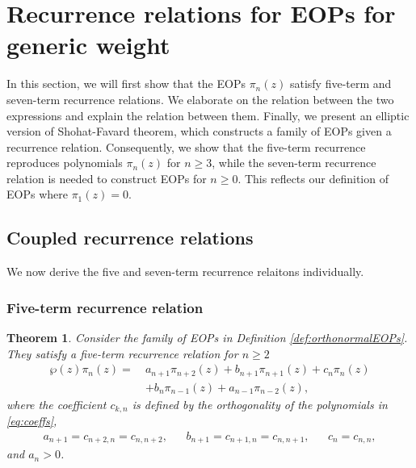 \documentclass[11pt,a4paper]{article}
\newtheorem{theorem}{Theorem}
\theoremstyle{definition}
\numberwithin{equation}{section}
\numberwithin{theorem}{section}
\newcommand{\myrmk}[2]{\begin{quote}\fbox{\begin{minipage}{\linewidth}\small \noindent{\color{red}\bf #2:} #1{\color{red}}\end{minipage}}\end{quote}}
\newcommand{\rmkH}[1]{\myrmk{#1}{HD}}
\begin{document}
\section{Recurrence relations for EOPs for generic weight}\label{sec:rec-rel}
In this section, we will first show that the EOPs $\pi_n(z)$ satisfy five-term and seven-term recurrence relations. We elaborate on the relation between the two expressions and explain the relation between them. Finally, we present an elliptic version of Shohat-Favard theorem, which constructs a family of EOPs given a recurrence relation. Consequently, we show that the five-term recurrence reproduces polynomials $\pi_n(z)$ for $n\geq 3$, while the seven-term recurrence relation is needed to construct EOPs for $n\geq 0$. This reflects our definition of EOPs where $\pi_1(z)=0$.


\subsection{Coupled recurrence relations}
We now derive the five and seven-term recurrence relaitons individually.
\subsubsection{Five-term recurrence relation}
\begin{theorem}\label{thm:five-term rec}
Consider the family of EOPs in Definition \ref{def:orthonormalEOPs}. They satisfy a five-term recurrence relation for $n\geq 2$
\begin{equation}\label{eq:5term}
\begin{aligned}
    \wp(z)\pi_n(z) =\ & a_{n+1}\pi_{n+2}(z) + b_{n+1}\pi_{n+1}(z) + c_n\pi_n(z) \\
    &+ b_n\pi_{n-1}(z) + a_{n-1}\pi_{n-2}(z),
\end{aligned}
\end{equation}
where the coefficient $c_{k,n}$ is defined by the orthogonality of the polynomials in \eqref{eq:coeffs},
\begin{align}\label{def:coeffsabc}
a_{n+1} = c_{n+2,n} = c_{n,n+2}, && b_{n+1} = c_{n+1,n} = c_{n,n+1}, &&  c_n = c_{n,n},
\end{align}
and \( a_{n} > 0 \).
\end{theorem}
\end{document}

